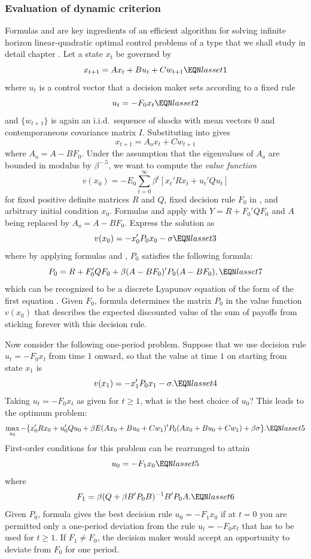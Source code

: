 \subsubsection{Evaluation of dynamic criterion}\label{sec:Howard1}%
Formulas  and  are key ingredients of an efficient algorithm for solving 
infinite horizon linear-quadratic optimal control problems of a type that we shall study in detail chapter .
 Let a state $x_t$ be governed by
$$ x_{t+1} = A x_t + B u_t + C w_{t+1} \EQN lasset1  $$
where $u_t$ is a control vector that  a decision maker sets according to
a fixed rule
$$ u_t = - F_0 x_t \EQN lasset2 $$
and $\{w_{t+1}\}$ is again an i.i.d.~sequence of shocks with mean vectors $0$ and contemporaneous covariance matrix $I$.
Substituting  into  gives
$$ x_{t+1} = A_o x_t + C w_{t+1} $$
where
$A_o = A - BF_0$. Under the assumption that the eigenvalues of $A_o$ are bounded in
modulus by $\beta^{-.5}$, we want to compute the  {\it value function\/}
%
$$  v(x_0) = - E_0 \sum_{t=0}^\infty \beta^t [x_t' R x_t + u_t' Q u_t] $$
for fixed positive definite matrices $R$ and $Q$,  fixed decision rule $F_0$ in ,
and arbitrary initial condition $x_0$.
Formulas   and  apply with
$Y = R + F_0' Q F_0$ and $A$ being replaced by $A_o=A-BF_0$.
Express the solution as
$$ v(x_0) = - x_0' P_0 x_0 - \sigma  \EQN lasset3 $$
where by applying formulas 
and , $P_0$ satisfies  the following formula:
$$ P_0 = R + F_0'QF_0 + \beta (A -BF_0)' P_0 (A-BF_0), \EQN lasset7 $$
which can be recognized to be a discrete Lyapunov equation of the form
of the first equation .
Given $F_0$, formula  determines the matrix $P_0$ in the
value function $v(x_0)$ that describes the expected discounted value of the sum
of payoffs from
sticking forever with this decision rule.


Now consider the following one-period problem.  Suppose that
we  use decision rule $u_t = - F_0 x_t$ from time $1$ onward,  so that
the value at time $1$ on starting from state $x_1$ is
$$ v(x_1) = - x_1' P_0 x_1 - \sigma. \EQN lasset4 $$
Taking $u_t= - F_0 x_t$ as given for $t \geq 1$,
what is the best choice of $u_0$?  This   leads
to the optimum problem:
$$ \max_{u_0} - \{x_0' R x_0 + u_0' Q u_0
  + \beta E(A x_0 + B u_0 + C w_1)' P_0 (A x_0 + B u_0 + C w_1)
  + \beta \sigma\}. \EQN lasset5 $$
First-order conditions for this problem can be rearranged to attain
$$ u_0 = - F_1 x_0 \EQN lasset5 $$
where $$ F_1 = \beta(Q + \beta B' P_0 B)^{-1} B' P_0 A.
 \EQN lasset6 $$
 Given $P_0$, formula
 gives the best decision rule $u_0 = - F_1
x_0$ if at $t=0$ you are permitted only a one-period deviation from the
rule $u_t = - F_0 x_t$ that has to be used  for $t \geq 1$.   If $F_1 \neq F_0$,  the decision
maker would accept an  opportunity to deviate from $F_0$ for one period.

